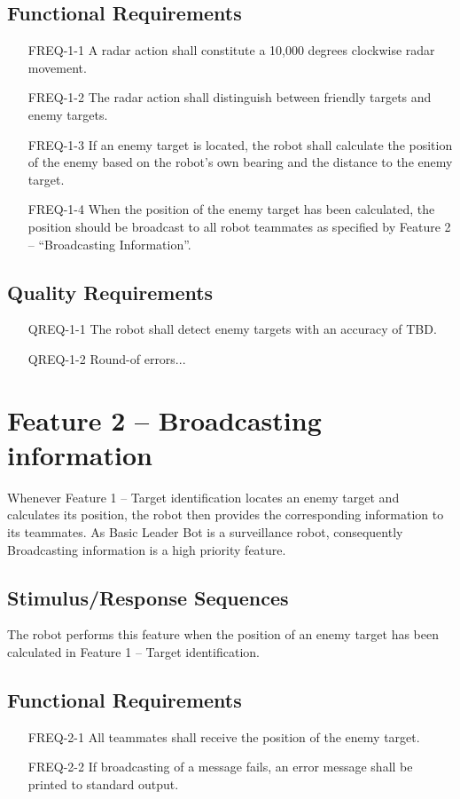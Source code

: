 \documentclass{scrreprt}
\begin{document}
\subsection{Functional Requirements}
\begin{itemize}
\item[FREQ-1-1] A radar action shall constitute a 10,000 degrees clockwise radar movement. 
\item[FREQ-1-2] The radar action shall distinguish between friendly targets and enemy targets.
\item[FREQ-1-3] If an enemy target is located, the robot shall calculate the position of the enemy based on the robot's own bearing and the distance to the enemy target. 
\item[FREQ-1-4] When the position of the enemy target has been calculated, the position should be broadcast to all robot teammates as specified by Feature 2 – ``Broadcasting Information''.
\end{itemize}

\subsection{Quality Requirements}
\begin{itemize}
\item[QREQ-1-1] The robot shall detect enemy targets with an accuracy of TBD. 
\item[QREQ-1-2] Round-of errors...
\end{itemize}

\section{Feature 2 -- Broadcasting information }
Whenever Feature 1 -- Target identification locates an enemy target and calculates its position, the robot then provides the corresponding information to its teammates. As Basic Leader Bot is a surveillance robot, consequently Broadcasting information is a high priority feature.

\subsection{Stimulus/Response Sequences}
The robot performs this feature when the position of an enemy target has been calculated in Feature 1 -- Target identification.

\subsection{Functional Requirements}
\begin{itemize}
\item[FREQ-2-1] All teammates shall receive the position of the enemy target. 
\item[FREQ-2-2] If broadcasting of a message fails, an error message shall be printed to standard output.
\end{itemize}
\end{document}
